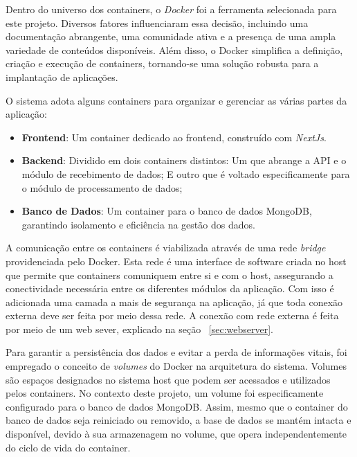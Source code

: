 Dentro do universo dos containers, o \textit{Docker} foi a ferramenta selecionada para este projeto. Diversos fatores influenciaram essa decisão, incluindo uma documentação abrangente, uma comunidade ativa e a presença de uma ampla variedade de conteúdos disponíveis. Além disso, o Docker simplifica a definição, criação e execução de containers, tornando-se uma solução robusta para a implantação de aplicações.

O sistema adota alguns containers para organizar e gerenciar as várias partes da aplicação:
\begin{itemize}
    \item \textbf{Frontend}: Um container dedicado ao frontend, construído com \textit{NextJs}.
    \item \textbf{Backend}: Dividido em dois containers distintos:
	\subitem Um que abrange a \gls{API} e o módulo de recebimento de dados;
	\subitem E outro que é voltado especificamente para o módulo de processamento de dados;
    \item \textbf{Banco de Dados}: Um container para o banco de dados MongoDB, garantindo isolamento e eficiência na gestão dos dados.
\end{itemize}

A comunicação entre os containers é viabilizada através de uma rede \textit{bridge} providenciada pelo Docker. Esta rede é uma interface de software criada no host que permite que containers comuniquem entre si e com o host, assegurando a conectividade necessária entre os diferentes módulos da aplicação. Com isso é adicionada uma camada a mais de segurança na aplicação, já que toda conexão externa deve ser feita por meio dessa rede. A conexão com rede externa é feita por meio de um web sever, explicado na seção ~\ref{sec:webserver}.

Para garantir a persistência dos dados e evitar a perda de informações vitais, foi empregado o conceito de \textit{volumes} do Docker na arquitetura do sistema. Volumes são espaços designados no sistema host que podem ser acessados e utilizados pelos containers. No contexto deste projeto, um volume foi especificamente configurado para o banco de dados MongoDB. Assim, mesmo que o container do banco de dados seja reiniciado ou removido, a base de dados se mantém intacta e disponível, devido à sua armazenagem no volume, que opera independentemente do ciclo de vida do container.

